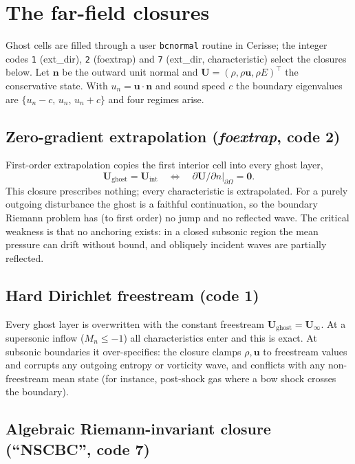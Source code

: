 \documentclass{jfm}
\newcommand{\Uvec}{\mathbf{U}}
\newcommand{\Uinf}{\mathbf{U}_\infty}
\begin{document}
\section{The far-field closures}\label{sec:closures}

Ghost cells are filled through a user \texttt{bcnormal} routine in Cerisse; the integer
codes \texttt{1} (ext\_dir), \texttt{2} (foextrap) and \texttt{7} (ext\_dir,
characteristic) select the closures below. Let $\bm n$ be the outward unit normal and
$\Uvec=(\rho,\rho\bm u,\rho E)^\top$ the conservative state. With $u_n=\bm u\!\cdot\!\bm n$
and sound speed $c$ the boundary eigenvalues are $\{u_n-c,\,u_n,\,u_n+c\}$ and four
regimes arise.

\subsection{Zero-gradient extrapolation (\textit{foextrap}, code 2)}

First-order extrapolation copies the first interior cell into every ghost layer,
\begin{equation}
\Uvec_{\mathrm{ghost}}=\Uvec_{\mathrm{int}}
\quad\Longleftrightarrow\quad
\partial\Uvec/\partial n|_{\partial\Omega}=\bm 0 .
\end{equation}
This closure prescribes nothing; every characteristic is extrapolated. For a
purely outgoing disturbance the ghost is a faithful continuation, so the boundary
Riemann problem has (to first order) no jump and no reflected wave. The critical
weakness is that no anchoring exists: in a closed subsonic region the mean
pressure can drift without bound, and obliquely incident waves are partially
reflected.

\subsection{Hard Dirichlet freestream (code 1)}

Every ghost layer is overwritten with the constant freestream $\Uvec_{\mathrm{ghost}}=\Uinf$.
At a supersonic inflow ($M_n\le-1$) all characteristics enter and this is exact.
At subsonic boundaries it over-specifies: the closure clamps $\rho,\bm u$ to freestream
values and corrupts any outgoing entropy or vorticity wave, and conflicts with any
non-freestream mean state (for instance, post-shock gas where a bow shock crosses the boundary).

\subsection{Algebraic Riemann-invariant closure (``NSCBC'', code 7)}
\label{sec:alg}
\end{document}
